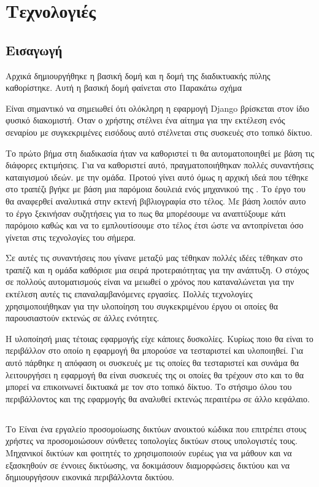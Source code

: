 \chapter{Τεχνολογιές}

\section{Εισαγωγή}

Αρχικά δημιουργήθηκε η βασική δομή και η δομή της διαδικτυακής πύλης καθορίστηκε. Αυτή η βασική δομή φαίνεται στο Παρακάτω σχήμα

Είναι σημαντικό να σημειωθεί ότι ολόκληρη η εφαρμογή Django βρίσκεται στον ίδιο φυσικό
διακομιστή. Όταν ο χρήστης στέλνει ένα αίτημα για την εκτέλεση ενός σεναρίου με συγκεκριμένες εισόδους αυτό στέλνεται στις συσκευές στο τοπικό δίκτυο.


Το πρώτο βήμα στη διαδικασία ήταν να καθοριστεί τι θα αυτοματοποιηθεί με βάση τις
διάφορες εκτιμήσεις. Για να καθοριστεί αυτό, πραγματοποιήθηκαν πολλές συναντήσεις καταιγισμού ιδεών.
με την ομάδα. Προτού γίνει αυτό όμως η αρχική ιδεά που τέθηκε στο τραπέζι βγήκε με βάση μια παρόμοια δουλειά ενός μηχανικού
της . Το έργο του θα αναφερθεί αναλυτικά στην εκτενή βιβλιογραφία στο τέλος. Με βάση λοιπόν
αυτο το έργο ξεκινήσαν συζητήσεις για το πως θα μπορέσουμε να αναπτύξουμε κάτι παρόμοιο
καθώς και να το εμπλουτίσουμε στο τέλος έτσι ώστε να αντοπρίνεται όσο γίνεται στις τεχνολογίες του
σήμερα.

Σε αυτές τις συναντήσεις που γίνανε μεταξύ μας τέθηκαν πολλές ιδέες τέθηκαν στο τραπέζι και η ομάδα καθόρισε
μια σειρά προτεραιότητας για την ανάπτυξη. Ο στόχος σε πολλούς αυτοματισμούς είναι να μειωθεί ο χρόνος που καταναλώνεται για την εκτέλεση
αυτές τις επαναλαμβανόμενες εργασίες. Πολλές τεχνολογίες χρησιμοποιήθηκαν για την υλοποίηση του συγκεκριμένου έργου οι οποίες θα παρουσιαστούν
εκτενώς σε άλλες ενότητες.

Η υλοποίησή μιας τέτοιας εφαρμογής είχε κάποιες δυσκολίες. Κυρίως ποιο θα είναι το περιβάλλον στο οποίο
η εφαρμογή θα μπορούσε να τεσταριστεί και υλοποιηθεί. Για αυτό πάρθηκε η απόφαση οι συσκευές με τις οποίες θα τεσταριστεί
και συνάμα θα λειτουργήσει η εφαρμογή θα είναι συσκευές της  οι οποίες θα τρέχουν στο 
και το  θα μπορεί να επικοινωνεί δικτυακά με τον  στο τοπικό δίκτυο.
Το στήσιμο όλου του περιβάλλοντος και της εφαρμογής θα αναλυθεί εκτενώς περαιτέρω σε άλλο κεφάλαιο.


\section{}
Το  Είναι ένα εργαλείο προσομοίωσης δικτύων ανοικτού κώδικα που επιτρέπει στους χρήστες να προσομοιώσουν 
σύνθετες τοπολογίες δικτύων στους υπολογιστές τους. Μηχανικοί δικτύων και φοιτητές 
το χρησιμοποιούν ευρέως για να μάθουν και να εξασκηθούν σε έννοιες δικτύωσης, να δοκιμάσουν διαμορφώσεις δικτύου και να δημιουργήσουν εικονικά περιβάλλοντα δικτύου.


